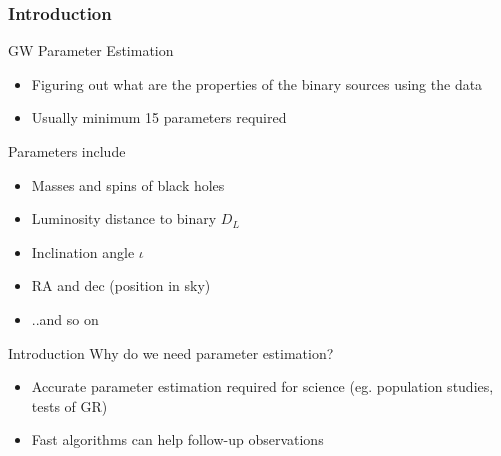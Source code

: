 \documentclass[uncompress,aspectratio=43]{beamer}  %
\begin{document}



\begin{frame}
\frametitle{Introduction}

\medskip
GW Parameter Estimation
\begin{itemize}
\item Figuring out what are the properties of the binary sources using the data
\item Usually minimum 15 parameters required
\end{itemize}

\pause
\medskip
Parameters include
\begin{itemize}
\item Masses and spins of black holes 
\item Luminosity distance to binary $D_L$
\item Inclination angle $\iota$
\item RA and dec (position in sky)
\item ..and so on
\end{itemize}

\end{frame}

\begin{frame}{Introduction}
  Why do we need parameter estimation?
\begin{itemize}
\item Accurate parameter estimation required for science (eg. population
  studies, tests of GR)
\item Fast algorithms can help follow-up observations

\end{itemize} 
\end{frame}
\end{document}
